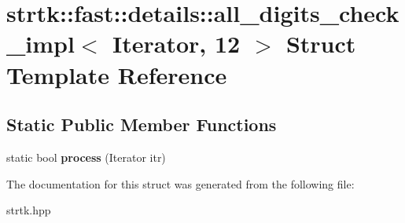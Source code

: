 \hypertarget{structstrtk_1_1fast_1_1details_1_1all__digits__check__impl_3_01Iterator_00_0112_01_4}{\section{strtk\-:\-:fast\-:\-:details\-:\-:all\-\_\-digits\-\_\-check\-\_\-impl$<$ Iterator, 12 $>$ Struct Template Reference}
\label{structstrtk_1_1fast_1_1details_1_1all__digits__check__impl_3_01Iterator_00_0112_01_4}
}
\subsection*{Static Public Member Functions}
\begin{DoxyCompactItemize}
\item 
\hypertarget{structstrtk_1_1fast_1_1details_1_1all__digits__check__impl_3_01Iterator_00_0112_01_4_ad65326efa716a16344758843fc930ff9}{static bool {\bfseries process} (Iterator itr)}\label{structstrtk_1_1fast_1_1details_1_1all__digits__check__impl_3_01Iterator_00_0112_01_4_ad65326efa716a16344758843fc930ff9}

\end{DoxyCompactItemize}


The documentation for this struct was generated from the following file\-:\begin{DoxyCompactItemize}
\item 
strtk.\-hpp\end{DoxyCompactItemize}
